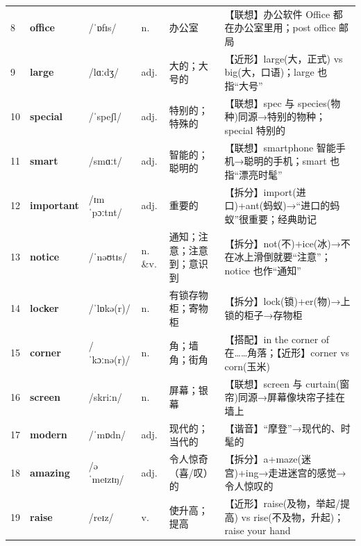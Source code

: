 \documentclass[UTF8,a4paper,11pt,oneside]{ctexbook}
\newcommand{\cellword}[1]{{\bfseries\textcolor{wordcol}{#1}}}
\newcommand{\cellipa}[1]{{\footnotesize\textcolor{ipacol}{#1}}}
\newcommand{\cellpos}[1]{\textcolor{poscol}{#1}}
\newcommand{\cellno}[1]{\textcolor{volcolor!75!black}{#1}}
\begin{document}
{\begin{longtable}{@{}C{0.045\textwidth}L{0.155\textwidth}L{0.175\textwidth}C{0.070\textwidth}L{0.180\textwidth}L{0.282\textwidth}@{}}
\cellno{8} & \cellword{office} & \cellipa{/ˈɒfɪs/} & \cellpos{n.} & 办公室 & \textcolor{tagAssoc}{【联想】}办公软件 Office 都在办公室里用；post office 邮局 \\
 \cellno{9} & \cellword{large} & \cellipa{/lɑːdʒ/} & \cellpos{adj.} & 大的；大号的 & \textcolor{tagNear}{【近形】}large(大，正式) vs big(大，口语)；large 也指“大号” \\
\cellno{10} & \cellword{special} & \cellipa{/ˈspeʃl/} & \cellpos{adj.} & 特别的；特殊的 & \textcolor{tagAssoc}{【联想】}spec 与 species(物种)同源→\allowbreak{}特别的物种；special 特别的 \\
 \cellno{11} & \cellword{smart} & \cellipa{/smɑːt/} & \cellpos{adj.} & 智能的；聪明的 & \textcolor{tagAssoc}{【联想】}smartphone 智能手机→\allowbreak{}聪明的手机；smart 也指“漂亮时髦” \\
\cellno{12} & \cellword{important} & \cellipa{/ɪmˈpɔːtnt/} & \cellpos{adj.} & 重要的 & \textcolor{tagSplit}{【拆分】}import(进口)+ant(蚂蚁)→\allowbreak{}“进口的蚂蚁”很重要；经典助记 \\
 \cellno{13} & \cellword{notice} & \cellipa{/ˈnəʊtɪs/} & \cellpos{n. \&v.} & 通知；注意；注意到；意识到 & \textcolor{tagSplit}{【拆分】}not(不)+ice(冰)→\allowbreak{}不在冰上滑倒就要“注意”；notice 也作“通知” \\
\cellno{14} & \cellword{locker} & \cellipa{/ˈlɒkə(r)/} & \cellpos{n.} & 有锁存物柜；寄物柜 & \textcolor{tagSplit}{【拆分】}lock(锁)+er(物)→\allowbreak{}上锁的柜子→\allowbreak{}存物柜 \\
 \cellno{15} & \cellword{corner} & \cellipa{/ˈkɔːnə(r)/} & \cellpos{n.} & 角；墙角；街角 & \textcolor{tagColloc}{【搭配】}in the corner of 在……角落；\textcolor{tagNear}{【近形】}corner vs corn(玉米) \\
\cellno{16} & \cellword{screen} & \cellipa{/skriːn/} & \cellpos{n.} & 屏幕；银幕 & \textcolor{tagAssoc}{【联想】}screen 与 curtain(窗帘)同源→\allowbreak{}屏幕像块帘子挂在墙上 \\
 \cellno{17} & \cellword{modern} & \cellipa{/ˈmɒdn/} & \cellpos{adj.} & 现代的；当代的 & \textcolor{tagSound}{【谐音】}“摩登”→\allowbreak{}现代的、时髦的 \\
\cellno{18} & \cellword{amazing} & \cellipa{/əˈmeɪzɪŋ/} & \cellpos{adj.} & 令人惊奇（喜/叹）的 & \textcolor{tagSplit}{【拆分】}a+maze(迷宫)+ing→\allowbreak{}走进迷宫的感觉→\allowbreak{}令人惊叹的 \\
 \cellno{19} & \cellword{raise} & \cellipa{/reɪz/} & \cellpos{v.} & 使升高；提高 & \textcolor{tagNear}{【近形】}raise(及物，举起/提高) vs rise(不及物，升起)；raise your hand \\

\end{longtable}}
\end{document}

